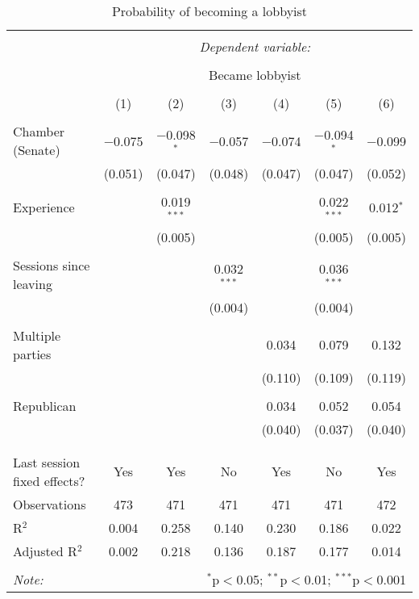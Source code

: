 \documentclass{article}
\begin{document}
  \begin{table}[!htbp] \centering 
    \caption{Probability of becoming a lobbyist} 
    \label{tab:lobbyist_basic} 
  \begin{tabular}{@{\extracolsep{5pt}}lcccccc} 
  \\[-1.8ex]\hline 
  \hline \\[-1.8ex] 
   & \multicolumn{6}{c}{\textit{Dependent variable:}} \\ 
  \cline{2-7} 
  \\[-1.8ex] & \multicolumn{6}{c}{Became lobbyist} \\ 
  \\[-1.8ex] & (1) & (2) & (3) & (4) & (5) & (6)\\ 
  \hline \\[-1.8ex] 
    Chamber (Senate) & $-$0.075 & $-$0.098$^{*}$ & $-$0.057 & $-$0.074 & $-$0.094$^{*}$ & $-$0.099 \\ 
    & (0.051) & (0.047) & (0.048) & (0.047) & (0.047) & (0.052) \\ 
    & & & & & & \\ 
   Experience &  & 0.019$^{***}$ &  &  & 0.022$^{***}$ & 0.012$^{*}$ \\ 
    &  & (0.005) &  &  & (0.005) & (0.005) \\ 
    & & & & & & \\ 
    Sessions since leaving &  &  & 0.032$^{***}$ &  & 0.036$^{***}$ &  \\ 
    &  &  & (0.004) &  & (0.004) &  \\ 
    & & & & & & \\ 
   Multiple parties &  &  &  & 0.034 & 0.079 & 0.132 \\ 
    &  &  &  & (0.110) & (0.109) & (0.119) \\ 
    & & & & & & \\ 
   Republican &  &  &  & 0.034 & 0.052 & 0.054 \\ 
    &  &  &  & (0.040) & (0.037) & (0.040) \\ 
    & & & & & & \\ 
  \hline \\[-1.8ex] 
  Last session fixed effects? & Yes & Yes & No & Yes & No & Yes \\ 
  Observations & 473 & 471 & 471 & 471 & 471 & 472 \\ 
  R$^{2}$ & 0.004 & 0.258 & 0.140 & 0.230 & 0.186 & 0.022 \\ 
  Adjusted R$^{2}$ & 0.002 & 0.218 & 0.136 & 0.187 & 0.177 & 0.014 \\ 
  \hline 
  \hline \\[-1.8ex] 
  \textit{Note:}  & \multicolumn{6}{r}{$^{*}$p$<$0.05; $^{**}$p$<$0.01; $^{***}$p$<$0.001} \\ 
  \end{tabular} 
  \end{table} 

\nocite{stargazer}

\pagebreak
\printbibliography
\end{document}
